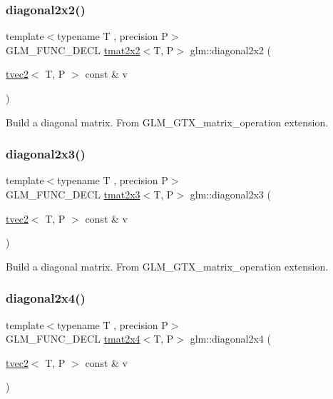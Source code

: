 \subsubsection{\texorpdfstring{diagonal2x2()}{diagonal2x2()}}
{\footnotesize\ttfamily template$<$typename T , precision P$>$ \\
G\+L\+M\+\_\+\+F\+U\+N\+C\+\_\+\+D\+E\+CL \hyperlink{structglm_1_1tmat2x2}{tmat2x2}$<$T, P$>$ glm\+::diagonal2x2 (\begin{DoxyParamCaption}\item[{\hyperlink{structglm_1_1tvec2}{tvec2}$<$ T, P $>$ const \&}]{v }\end{DoxyParamCaption})}

Build a diagonal matrix. From G\+L\+M\+\_\+\+G\+T\+X\+\_\+matrix\+\_\+operation extension. \mbox{\label{group__gtx__matrix__operation_ga763817f07d6a94b722a48adfa87a35db}} 
\subsubsection{\texorpdfstring{diagonal2x3()}{diagonal2x3()}}
{\footnotesize\ttfamily template$<$typename T , precision P$>$ \\
G\+L\+M\+\_\+\+F\+U\+N\+C\+\_\+\+D\+E\+CL \hyperlink{structglm_1_1tmat2x3}{tmat2x3}$<$T, P$>$ glm\+::diagonal2x3 (\begin{DoxyParamCaption}\item[{\hyperlink{structglm_1_1tvec2}{tvec2}$<$ T, P $>$ const \&}]{v }\end{DoxyParamCaption})}

Build a diagonal matrix. From G\+L\+M\+\_\+\+G\+T\+X\+\_\+matrix\+\_\+operation extension. \mbox{\label{group__gtx__matrix__operation_ga49b37c819cf6dd8e35112ed1a13d45a3}} 
\subsubsection{\texorpdfstring{diagonal2x4()}{diagonal2x4()}}
{\footnotesize\ttfamily template$<$typename T , precision P$>$ \\
G\+L\+M\+\_\+\+F\+U\+N\+C\+\_\+\+D\+E\+CL \hyperlink{structglm_1_1tmat2x4}{tmat2x4}$<$T, P$>$ glm\+::diagonal2x4 (\begin{DoxyParamCaption}\item[{\hyperlink{structglm_1_1tvec2}{tvec2}$<$ T, P $>$ const \&}]{v }\end{DoxyParamCaption})}

